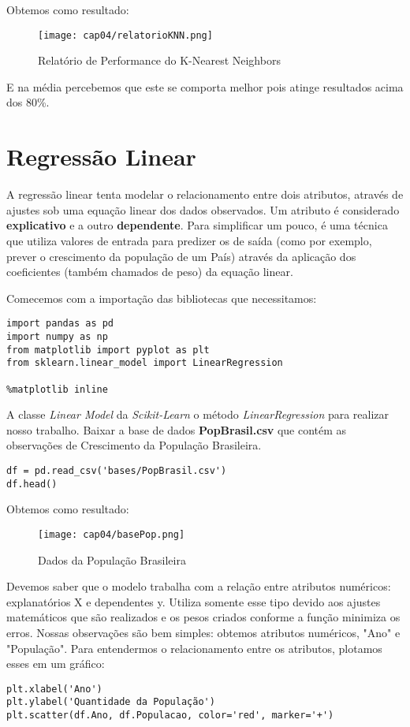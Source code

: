 Obtemos como resultado:
\begin{figure}[H]
	\centering
	\texttt{[image: cap04/relatorioKNN.png]}
	\caption{Relatório de Performance do K-Nearest Neighbors}
\end{figure}

E na média percebemos que este se comporta melhor pois atinge resultados acima dos 80\%.

\section{Regressão Linear}
A regressão linear tenta modelar o relacionamento entre dois atributos, através de ajustes sob uma equação linear dos dados observados. Um atributo é considerado \textbf{explicativo} e a outro \textbf{dependente}. Para simplificar um pouco, é uma técnica que utiliza valores de entrada para predizer os de saída (como por exemplo, prever o crescimento da população de um País) através da aplicação dos coeficientes (também chamados de peso) da equação linear. 

Comecemos com a importação das bibliotecas que necessitamos:
\begin{lstlisting}[]
import pandas as pd
import numpy as np
from matplotlib import pyplot as plt
from sklearn.linear_model import LinearRegression

%matplotlib inline
\end{lstlisting}

A classe \textit{Linear Model} da \textit{Scikit-Learn} o método \textit{LinearRegression} para realizar nosso trabalho. Baixar a base de dados \textbf{PopBrasil.csv} que contém as observações de Crescimento da População Brasileira.
\begin{lstlisting}[]
df = pd.read_csv('bases/PopBrasil.csv')
df.head()
\end{lstlisting}

Obtemos como resultado:
\begin{figure}[H]
	\centering
	\texttt{[image: cap04/basePop.png]}
	\caption{Dados da População Brasileira}
\end{figure}

Devemos saber que o modelo trabalha com a relação entre atributos numéricos: explanatórios X e dependentes y. Utiliza somente esse tipo devido aos ajustes matemáticos que são realizados e os pesos criados conforme a função minimiza os erros. Nossas observações são bem simples: obtemos atributos numéricos, "Ano" e "População". Para entendermos o relacionamento entre os atributos, plotamos esses em um gráfico:
\begin{lstlisting}[]
plt.xlabel('Ano')
plt.ylabel('Quantidade da População')
plt.scatter(df.Ano, df.Populacao, color='red', marker='+')
\end{lstlisting}

